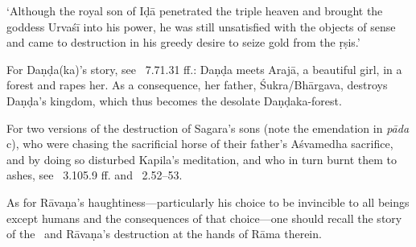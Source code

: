 {{ 
  `Although the royal son of Iḍā penetrated the triple heaven and brought
  the goddess Urvaśī into his power, he was still unsatisfied with the 
  objects of sense and came to destruction in his greedy desire to seize
  gold from the ṛṣis.'
  
 
  For Daṇḍa{\rm (}ka{\rm )}'s story, see \RAMAYANA\ 7.71.31 ff.:
  Daṇḍa meets Arajā, a beautiful girl, in a forest and rapes her. As a consequence, 
  her father, Śukra/Bhārgava, destroys Daṇḍa's kingdom, which thus
  becomes the desolate Daṇḍaka-forest.
 
  
 
  For two versions of the destruction of
  Sagara's sons {\rm (}note the emendation in \textit{pāda} c{\rm )}, 
  who were chasing the sacrificial horse of their father's Aśvamedha sacrifice,
  and by doing so disturbed Kapila's meditation, and who in turn burnt them to ashes,
  see \MBH~3.105.9 ff. and \BrahmandaPur\ 2.52--53.
 
  
 
  As for Rāvaṇa's haughtiness---particularly his choice to be invincible to all 
  beings except humans and the consequences of that choice---one should recall the 
  story of the \Ramayana\ and Rāvaṇa's destruction at the hands of Rāma therein.
 }}


